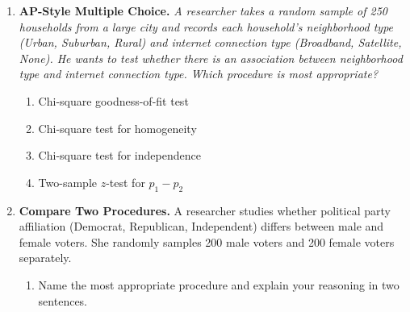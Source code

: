 \documentclass[10pt]{article}
\begin{document}
\begin{enumerate}
      \begin{enumerate}[label=\alph*.]
        \item \textbf{State:} Procedure: \blank{7cm}\\
              $H_0$: \blank{5cm} \quad $H_a$: \blank{5cm}
        \item \textbf{Plan:} Verify conditions (use numbers):
              \begin{itemize}
                \item Random: \writeline
                \item 10\%: \writeline
                \item Large Counts ($np_0$ and $n(1-p_0)$ each $\ge 10$): \writeline
              \end{itemize}
      \end{enumerate}

\vspace{0.10in}

\item \textbf{AP-Style Multiple Choice.} \;
      \textit{A researcher takes a random sample of 250 households from a large city and records
      each household's neighborhood type (Urban, Suburban, Rural) and internet connection type
      (Broadband, Satellite, None). He wants to test whether there is an association between
      neighborhood type and internet connection type. Which procedure is most appropriate?}

      \begin{enumerate}[label=(\Alph*)]
        \item Chi-square goodness-of-fit test
        \item Chi-square test for homogeneity
        \item Chi-square test for independence
        \item Two-sample $z$-test for $p_1 - p_2$
      \end{enumerate}

\vspace{0.10in}

\item \textbf{Compare Two Procedures.} \;
      A researcher studies whether political party affiliation (Democrat, Republican, Independent)
      differs between male and female voters. She randomly samples 200 male voters and 200 female
      voters separately.

      \begin{enumerate}[label=\alph*.]
        \item Name the most appropriate procedure and explain your reasoning in two sentences.
              \writeline \writeline


\end{enumerate}
\end{enumerate}
\end{document}
